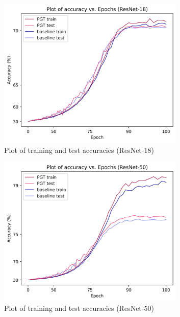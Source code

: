 \documentclass[runningheads]{llncs}
\begin{document}
\begin{figure}[!t]
\centering
\begin{subfigure}{.33\textwidth}
\centering
\includegraphics[width=0.98\textwidth]{acc_vs_epoch_r18}
\caption{Plot of training and test accuracies (ResNet-18)}
\end{subfigure}%
\begin{subfigure}{.33\textwidth}
\centering
\includegraphics[width=0.98\textwidth]{acc_vs_epoch_r50}
\caption{Plot of training and test accuracies (ResNet-50)}
\end{subfigure}%
\begin{subfigure}{.33\textwidth}

\end{subfigure}
\end{figure}
\end{document}

